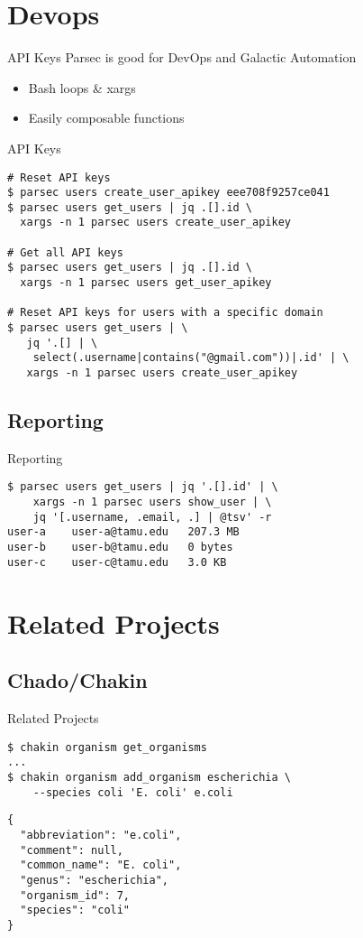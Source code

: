 \documentclass[12pt]{phage3slides} %
\begin{document}
\section{Devops}
\begin{frame}[fragile]{API Keys}
Parsec is good for DevOps and Galactic Automation
\begin{itemize}
	\item Bash loops \& xargs
	\item Easily composable functions
\end{itemize}
\end{frame}


\begin{frame}[fragile,t]{API Keys}
\begin{verbatim}
# Reset API keys
$ parsec users create_user_apikey eee708f9257ce041
$ parsec users get_users | jq .[].id \
  xargs -n 1 parsec users create_user_apikey

# Get all API keys
$ parsec users get_users | jq .[].id \
  xargs -n 1 parsec users get_user_apikey

# Reset API keys for users with a specific domain
$ parsec users get_users | \
   jq '.[] | \
    select(.username|contains("@gmail.com"))|.id' | \
   xargs -n 1 parsec users create_user_apikey
\end{verbatim}
\end{frame}


\subsection{Reporting}
\begin{frame}[fragile,t]{Reporting}
\begin{verbatim}
$ parsec users get_users | jq '.[].id' | \
    xargs -n 1 parsec users show_user | \
    jq '[.username, .email, .] | @tsv' -r
user-a    user-a@tamu.edu   207.3 MB
user-b    user-b@tamu.edu   0 bytes
user-c    user-c@tamu.edu   3.0 KB
\end{verbatim}
\end{frame}



\section{Related Projects}
\subsection{Chado/Chakin}
\begin{frame}[fragile,t]{Related Projects}
\begin{verbatim}
$ chakin organism get_organisms
...
$ chakin organism add_organism escherichia \
    --species coli 'E. coli' e.coli
\end{verbatim}
\begin{verbatim}
{
  "abbreviation": "e.coli",
  "comment": null,
  "common_name": "E. coli",
  "genus": "escherichia",
  "organism_id": 7,
  "species": "coli"
}
\end{verbatim}
\end{frame}
\end{document}
